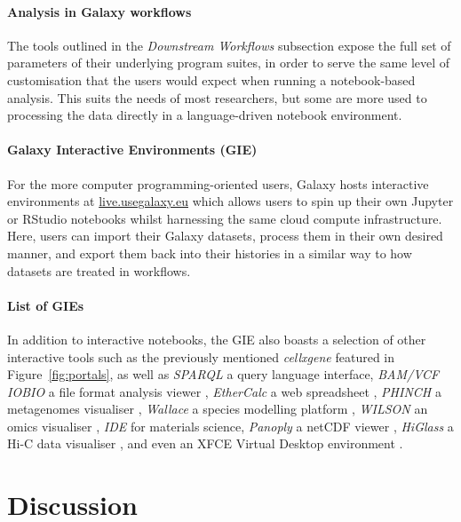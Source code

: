 \documentclass[a4paper,num-refs]{oup-contemporary}
\newcommand{\prog}[1]{\textit{#1}} %
\begin{document}
\paragraph{Analysis in Galaxy workflows}
The tools outlined in the \textit{Downstream Workflows} subsection expose the full set of parameters of their underlying program suites, in order to serve the same level of customisation that the users would expect when running a notebook-based analysis. This suits the needs of most researchers, but some are more used to processing the data directly in a language-driven notebook environment.


\paragraph{Galaxy Interactive Environments (GIE)}
For the more computer programming-oriented users, Galaxy hosts interactive environments at \url{live.usegalaxy.eu} which allows users to spin up their own Jupyter \citep{kluyver2016jupyter} or RStudio \citep{allaire2012rstudio} notebooks whilst harnessing the same cloud compute infrastructure. Here, users can import their Galaxy datasets, process them in their own desired manner, and export them back into their histories in a similar way to how datasets are treated in workflows. 

\paragraph{List of GIEs}
In addition to interactive notebooks, the GIE also boasts a selection of other interactive tools such as the previously mentioned \prog{cellxgene} featured in Figure~\ref{fig:portals}, as well as \prog{SPARQL} a query language interface, \prog{BAM/VCF IOBIO} a file format analysis viewer \citep{iobio}, \prog{EtherCalc} a web spreadsheet \citep{ethercalc}, \prog{PHINCH} a metagenomes visualiser \citep{bik2014phinch}, \prog{Wallace} a species modelling platform \citep{kass2018wallace}, \prog{WILSON} an omics visualiser \citep{schultheis2019wilson}, \prog{IDE} for materials science, \prog{Panoply} a netCDF viewer \citep{schmunk2018panoply}, \prog{HiGlass} a Hi-C data visualiser \citep{kerpedjiev2018higlass}, and even an XFCE Virtual Desktop environment \citep{fourdan2000xfce}.


\section{Discussion}
\end{document}
